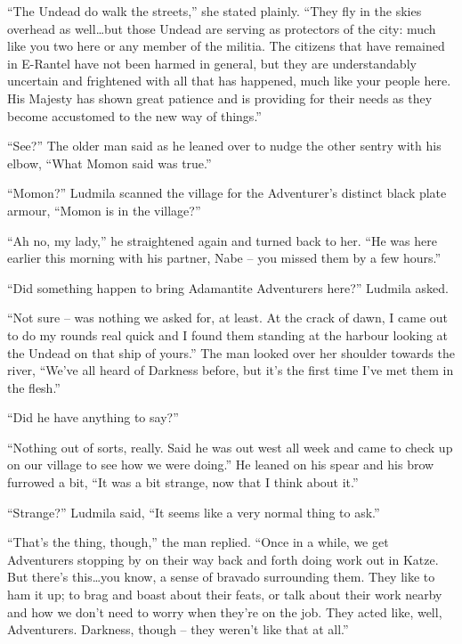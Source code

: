“The Undead do walk the streets,” she stated plainly. “They fly in the skies overhead as well…but those Undead are serving as protectors of the city: much like you two here or any member of the militia. The citizens that have remained in E-Rantel have not been harmed in general, but they are understandably uncertain and frightened with all that has happened, much like your people here. His Majesty has shown great patience and is providing for their needs as they become accustomed to the new way of things.”

 

“See?” The older man said as he leaned over to nudge the other sentry with his elbow, “What Momon said was true.”

 

“Momon?” Ludmila scanned the village for the Adventurer’s distinct black plate armour, “Momon is in the village?”

 

“Ah no, my lady,” he straightened again and turned back to her. “He was here earlier this morning with his partner, Nabe – you missed them by a few hours.”

 

“Did something happen to bring Adamantite Adventurers here?” Ludmila asked.

 

“Not sure – was nothing we asked for, at least. At the crack of dawn, I came out to do my rounds real quick and I found them standing at the harbour looking at the Undead on that ship of yours.” The man looked over her shoulder towards the river, “We’ve all heard of Darkness before, but it’s the first time I’ve met them in the flesh.”

 

“Did he have anything to say?”

 

“Nothing out of sorts, really. Said he was out west all week and came to check up on our village to see how we were doing.” He leaned on his spear and his brow furrowed a bit, “It was a bit strange, now that I think about it.”

 

“Strange?” Ludmila said, “It seems like a very normal thing to ask.”

 

“That’s the thing, though,” the man replied. “Once in a while, we get Adventurers stopping by on their way back and forth doing work out in Katze. But there’s this…you know, a sense of bravado surrounding them. They like to ham it up; to brag and boast about their feats, or talk about their work nearby and how we don’t need to worry when they’re on the job. They acted like, well, Adventurers. Darkness, though – they weren’t like that at all.”

